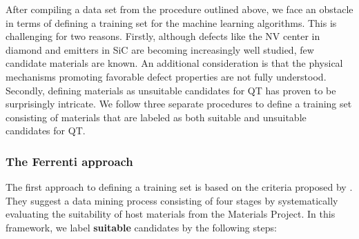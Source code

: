 \documentclass[superscriptaddress,unsortedaddress,
 amsmath,amssymb,
 aps,
]{revtex4-2}
\begin{document}
After compiling a data set from the procedure outlined above, we face an obstacle in terms of defining a training set for the machine learning algorithms. This is challenging for two reasons. 
Firstly, although defects like the NV center in diamond and emitters in SiC are becoming
increasingly well studied, few candidate materials are known. An additional consideration 
is that the physical mechanisms promoting favorable defect properties are not fully understood. Secondly, defining materials as unsuitable candidates for QT has proven to be surprisingly intricate. 
We follow three separate procedures to define a training set consisting of materials that are labeled as both suitable and unsuitable candidates for QT. 

\subsubsection*{The Ferrenti approach}
The first approach to defining a training set is based on the criteria proposed by \citeauthor{Ferrenti2020} \cite{Ferrenti2020}.
They suggest a data mining process consisting of four stages by systematically evaluating the suitability of host materials from the Materials Project. In this framework, we label \textbf{suitable} candidates by the following steps:
\end{document}
